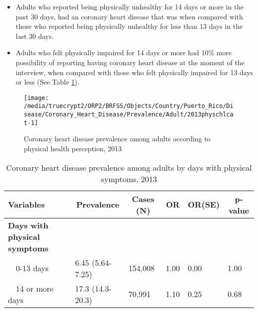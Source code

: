  
\newpage

 \newpage
\begin{itemize}

\item Adults who reported being physically unhealthy for 14 days or more in the past 30 days, had an coronary heart disease that was 
 when compared with 
those who reported being physically unhealthy for less than 13 days in the last 30 days.


\item Adults who felt physically impaired for 14 days or more had 10\% more possibility of reporting having coronary heart disease at the moment of the interview, when compared with those who felt physically impaired for 13 days or less (See Table \ref{tab:phys.Coronary_Heart_Disease.2013}).

\end{itemize}

\begin{figure}[H]
\caption{Coronary heart disease prevalence among adults according to physical health perception, 2013}
\label{fig:phys.Coronary_Heart_Disease.2013}
\begin{knitrout}
\color{fgcolor}

{\centering \texttt{[image: /media/truecrypt2/ORP2/BRFSS/Objects/Country/Puerto\_Rico/Disease/Coronary\_Heart\_Disease/Prevalence/Adult/2013physchlcat-1]} 

}



\end{knitrout}
 \end{figure}

\begin{table}[H]
\caption{Coronary heart disease prevalence among adults by days with physical symptoms, 2013\label{tab:phys.Coronary_Heart_Disease.2013}} 
\begin{center}
\begin{tabular}{llllll}
\hline\hline
\multicolumn{1}{l}{Variables}&\multicolumn{1}{c}{Prevalence}&\multicolumn{1}{c}{Cases (N)}&\multicolumn{1}{c}{OR}&\multicolumn{1}{c}{OR(SE)}&\multicolumn{1}{c}{p-value}\tabularnewline
\hline
{\bfseries Days with physical symptoms}&&&&&\tabularnewline
~~0-13 days&6.45 (5.64-7.25)&154,008&1.00&0.00&1.00\tabularnewline
~~14 or more days&17.3 (14.3-20.3)& 70,991&1.10&0.25&0.68\tabularnewline
\hline
\end{tabular}\end{center}

\end{table}


